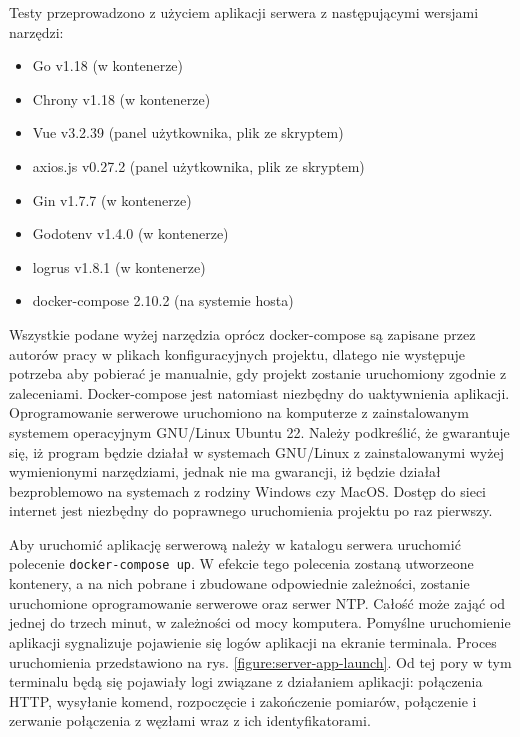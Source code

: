 \documentclass[12pt,oneside,a4paper]{book}
\theoremstyle{break}
\begin{document}
Testy przeprowadzono z użyciem aplikacji serwera z następującymi
wersjami narzędzi:
\begin{itemize}
    \item Go v1.18 (w kontenerze)
    \item Chrony v1.18 (w kontenerze)
    \item Vue v3.2.39 (panel użytkownika, plik ze skryptem)
    \item axios.js v0.27.2 (panel użytkownika, plik ze skryptem)
    \item Gin v1.7.7 (w kontenerze)
    \item Godotenv v1.4.0 (w kontenerze)
    \item logrus v1.8.1 (w kontenerze)
    \item docker-compose 2.10.2 (na systemie hosta)
\end{itemize}
Wszystkie podane wyżej narzędzia oprócz docker-compose są zapisane przez 
autorów pracy w plikach konfiguracyjnych projektu, dlatego nie występuje
potrzeba aby pobierać je manualnie, gdy projekt zostanie uruchomiony zgodnie
z zaleceniami. Docker-compose jest natomiast
niezbędny do uaktywnienia aplikacji. 
Oprogramowanie serwerowe uruchomiono na komputerze z zainstalowanym
systemem operacyjnym GNU/Linux Ubuntu 22. Należy podkreślić, że 
gwarantuje się, iż program będzie działał w systemach GNU/Linux
z zainstalowanymi wyżej wymienionymi narzędziami, jednak nie ma
gwarancji, iż będzie działał bezproblemowo na systemach z rodziny Windows
czy MacOS.
Dostęp do sieci internet
jest niezbędny do poprawnego uruchomienia projektu po raz pierwszy.
\par Aby uruchomić aplikację serwerową należy w katalogu serwera
uruchomić polecenie \texttt{docker-compose up}. W efekcie tego 
polecenia zostaną utworzeone kontenery, a na nich pobrane i zbudowane 
odpowiednie zależności, zostanie uruchomione oprogramowanie
serwerowe oraz serwer NTP. Całość może zająć od jednej do trzech minut, 
w zależności od mocy komputera. Pomyślne uruchomienie aplikacji 
sygnalizuje pojawienie się logów aplikacji na ekranie terminala.
Proces uruchomienia przedstawiono na rys. \ref*{figure:server-app-launch}.
Od tej pory w tym terminalu będą się pojawiały logi związane z działaniem
aplikacji: połączenia HTTP, wysyłanie komend, rozpoczęcie i 
zakończenie pomiarów, połączenie i zerwanie połączenia z węzłami
wraz z ich identyfikatorami.
\end{document}
